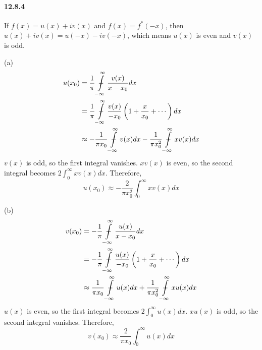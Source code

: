 \documentclass[a4paper]{article}
\begin{document}
\paragraph{12.8.4}
If $f(x)=u(x)+iv(x)$ and $f(x)=f^*(-x)$, then $u(x)+iv(x)=u(-x)-iv(-x)$, which means $u(x)$ is even and $v(x)$ is odd.
\medskip

(a)
\begin{equation*}
    \begin{split}
        u(x_0) & =\frac{1}{\pi}\ddashint\displaylimits_{-\infty}^\infty\frac{v(x)}{x-x_0}dx\\
        & =\frac{1}{\pi}\ddashint\displaylimits_{-\infty}^\infty\frac{v(x)}{-x_0}\left(1+\frac{x}{x_0}+\cdots \right)dx\\
        & \approx -\frac{1}{\pi x_0}\ddashint\displaylimits_{-\infty}^\infty v(x)dx-\frac{1}{\pi x_0^2}\ddashint\displaylimits_{-\infty}^\infty xv(x)dx
    \end{split}
\end{equation*}
$v(x)$ is odd, so the first integral vanishes. $xv(x)$ is even, so the second integral becomes $2\int_0^\infty xv(x)dx$. Therefore,
\[
u(x_0)\approx-\frac{2}{\pi x_0^2}\int_0^\infty xv(x)dx
\]

(b)
\begin{equation*}
    \begin{split}
        v(x_0) & =-\frac{1}{\pi}\ddashint\displaylimits_{-\infty}^\infty\frac{u(x)}{x-x_0}dx\\
        & =-\frac{1}{\pi}\ddashint\displaylimits_{-\infty}^\infty\frac{u(x)}{-x_0}\left(1+\frac{x}{x_0}+\cdots \right)dx\\
        & \approx\frac{1}{\pi x_0}\ddashint\displaylimits_{-\infty}^\infty u(x)dx+\frac{1}{\pi x_0^2}\ddashint\displaylimits_{-\infty}^\infty xu(x)dx
    \end{split}
\end{equation*}
$u(x)$ is even, so the first integral becomes $2\int_0^\infty u(x)dx$.\; $xu(x)$ is odd, so the second integral vanishes. Therefore,
\[
v(x_0)\approx\frac{2}{\pi x_0}\int_0^\infty u(x)dx
\]
\end{document}
